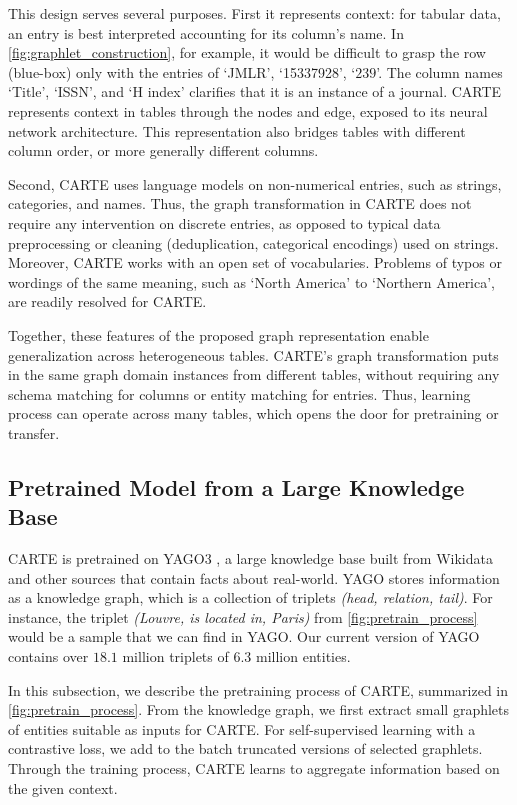 \documentclass{article}
\theoremstyle{plain}
\theoremstyle{definition}
\theoremstyle{remark}
\begin{document}
This design serves several purposes. First it represents context: for tabular data, an entry is best interpreted accounting for its column's name. In \autoref{fig:graphlet_construction}, for example, it would be difficult to grasp the row (blue-box) only with the entries of `JMLR', `15337928', `$239$'. The column names `Title', `ISSN', and `H index' clarifies that it is an instance of a journal. CARTE represents context in tables through the nodes and edge, exposed to its neural network architecture.
This representation also bridges tables with different column order, or more generally different columns.

Second, CARTE uses language models on non-numerical entries, such as strings, categories, and names. Thus, the graph transformation in CARTE does not require any intervention on discrete entries, as opposed to typical data preprocessing or cleaning (deduplication, categorical encodings) used on strings. Moreover, CARTE works with an open set of vocabularies. Problems of typos or wordings of the same meaning, such as `North America' to `Northern America', are readily resolved for CARTE.

Together, these features of the proposed graph representation enable generalization across heterogeneous tables. CARTE's graph transformation puts in the same  graph domain instances from different tables, without requiring any schema matching for columns or entity matching for entries. Thus, learning process can operate across many tables, which opens the door for pretraining or transfer.

\subsection{Pretrained Model from a Large Knowledge Base}
CARTE is pretrained on YAGO3 \citep{mahdisoltani2013yago3}, a large knowledge base built from Wikidata and other sources that contain facts about real-world. YAGO stores information as a knowledge graph, which is a collection of triplets \emph{(head, relation, tail)}. For instance, the triplet \emph{(Louvre, is located in, Paris)} from \autoref{fig:pretrain_process} would be a sample that we can find in YAGO. Our current version of YAGO contains over $18.1$ million triplets of $6.3$ million entities.

In this subsection, we describe the pretraining process of CARTE, summarized in \autoref{fig:pretrain_process}. From the knowledge graph, we first extract small graphlets of entities suitable as inputs for CARTE. For self-supervised learning with a contrastive loss, we add to the batch truncated versions of selected graphlets. Through the training process, CARTE learns to aggregate information based on the given context. 
\end{document}
